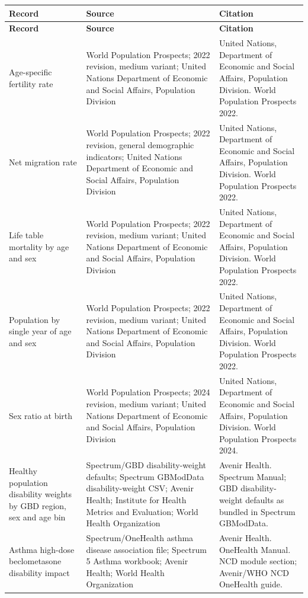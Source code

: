 \documentclass[11pt]{article}
\newcommand{\sectiontitle}[1]{\clearpage\phantomsection\addcontentsline{toc}{section}{#1}{\large\bfseries #1}\par\vspace{-2pt}}
\begin{document}
\sectiontitle{Provenance}
\begingroup
\small
\begin{longtable}{@{}p{1.85in}p{2.25in}p{2.25in}@{}}
\toprule
\textbf{Record} & \textbf{Source} & \textbf{Citation}\\
\midrule
\endfirsthead
\toprule
\textbf{Record} & \textbf{Source} & \textbf{Citation}\\
\midrule
\endhead
\bottomrule
\endfoot
Age-specific fertility rate & World Population Prospects; 2022 revision, medium variant; United Nations Department of Economic and Social Affairs, Population Division & United Nations, Department of Economic and Social Affairs, Population Division. World Population Prospects 2022.\\
Net migration rate & World Population Prospects; 2022 revision, general demographic indicators; United Nations Department of Economic and Social Affairs, Population Division & United Nations, Department of Economic and Social Affairs, Population Division. World Population Prospects 2022.\\
Life table mortality by age and sex & World Population Prospects; 2022 revision, medium variant; United Nations Department of Economic and Social Affairs, Population Division & United Nations, Department of Economic and Social Affairs, Population Division. World Population Prospects 2022.\\
Population by single year of age and sex & World Population Prospects; 2022 revision, medium variant; United Nations Department of Economic and Social Affairs, Population Division & United Nations, Department of Economic and Social Affairs, Population Division. World Population Prospects 2022.\\
Sex ratio at birth & World Population Prospects; 2024 revision, medium variant; United Nations Department of Economic and Social Affairs, Population Division & United Nations, Department of Economic and Social Affairs, Population Division. World Population Prospects 2024.\\
Healthy population disability weights by GBD region, sex and age bin & Spectrum/GBD disability-weight defaults; Spectrum GBModData disability-weight CSV; Avenir Health; Institute for Health Metrics and Evaluation; World Health Organization & Avenir Health. Spectrum Manual; GBD disability-weight defaults as bundled in Spectrum GBModData.\\
Asthma high-dose beclometasone disability impact & Spectrum/OneHealth asthma disease association file; Spectrum 5 Asthma workbook; Avenir Health; World Health Organization & Avenir Health. OneHealth Manual. NCD module section; Avenir/WHO NCD OneHealth guide.\\

\end{longtable}
\end{document}
